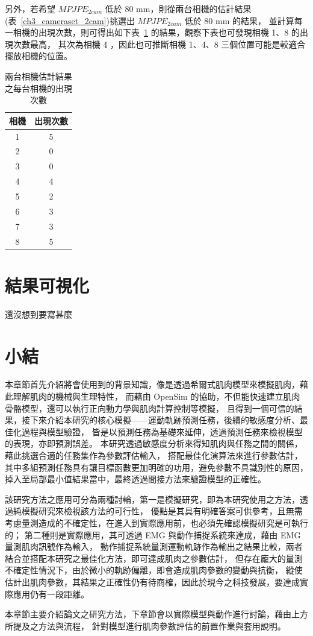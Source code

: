 另外，若希望 $MPJPE_{2 cam}$ 低於 80 mm，則從兩台相機的估計結果(表~\ref{ch3_cameraset_2cam})挑選出 $MPJPE_{2 cam}$ 低於 80 mm 的結果，
並計算每一相機的出現次數，則可得出如下表~\ref{ch3_cam_occurrence} 的結果，觀察下表也可發現相機 1、8 的出現次數最高，
其次為相機 4 ，因此也可推斷相機 1、4、8 三個位置可能是較適合擺放相機的位置。
\begin{table}[!ht]
   \caption[兩台相機估計結果之每台相機的出現次數]{兩台相機估計結果之每台相機的出現次數}
   \centering
   \label{ch3_cam_occurrence}
   \setlength{\tabcolsep}{3pt}
   \renewcommand\arraystretch{1.5}
   \begin{tabular}{c|c}
      相機 & 出現次數 \\
      \midrule[2pt]
      1 & 5 \\
      2 & 0 \\
      3 & 0 \\
      4 & 4 \\
      5 & 2 \\
      6 & 3 \\
      7 & 3 \\
      8 & 5 \\
   \end{tabular}
\end{table}

\section{結果可視化}
還沒想到要寫甚麼

\section{小結}
本章節首先介紹將會使用到的背景知識，像是透過希爾式肌肉模型來模擬肌肉，藉此理解肌肉的機械與生理特性，
而藉由 OpenSim 的協助，不但能快速建立肌肉骨骼模型，還可以執行正向動力學與肌肉計算控制等模擬，
且得到一個可信的結果，接下來介紹本研究的核心模擬——運動軌跡預測任務，後續的敏感度分析、最佳化過程與模型驗證，
皆是以預測任務為基礎來延伸，透過預測任務來檢視模型的表現，亦即預測誤差。
本研究透過敏感度分析來得知肌肉與任務之間的關係，藉此挑選合適的任務集作為參數評估輸入，
搭配最佳化演算法來進行參數估計，其中多組預測任務具有讓目標函數更加明確的功用，避免參數不具識別性的原因，
掉入至局部最小值結果當中，最終透過間接方法來驗證模型的正確性。

該研究方法之應用可分為兩種討輪，第一是模擬研究，即為本研究使用之方法，透過純模擬研究來檢視該方法的可行性，
優點是其具有明確答案可供參考，且無需考慮量測造成的不確定性，在進入到實際應用前，也必須先確認模擬研究是可執行的；
第二種則是實際應用，其可透過 EMG 與動作捕捉系統來達成，藉由 EMG 量測肌肉訊號作為輸入，
動作捕捉系統量測運動軌跡作為輸出之結果比較，兩者結合並搭配本研究之最佳化方法，即可達成肌肉之參數估計，
但存在龐大的量測不確定性情況下，由於微小的軌跡偏離，即會造成肌肉參數的變動與抗衡，
縱使估計出肌肉參數，其結果之正確性仍有待商榷，因此於現今之科技發展，要達成實際應用仍有一段距離。

本章節主要介紹論文之研究方法，下章節會以實際模型與動作進行討論，藉由上方所提及之方法與流程，
針對模型進行肌肉參數評估的前置作業與套用說明。

\clearpage